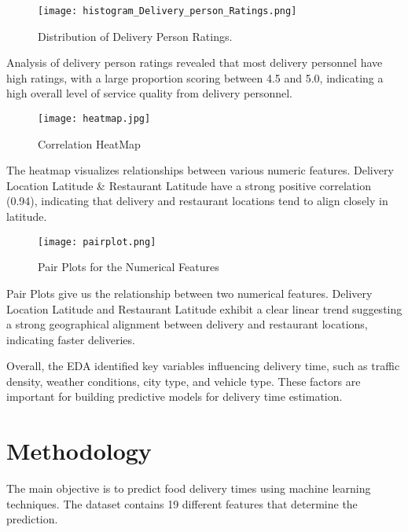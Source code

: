 \documentclass[10pt,twocolumn,letterpaper]{article}
\begin{document}
        \begin{figure}[ht]
            \centering
            \texttt{[image: histogram\_Delivery\_person\_Ratings.png]}
            \caption{Distribution of Delivery Person Ratings.}
            \label{fig:delivery_ratings}
        \end{figure}

        Analysis of delivery person ratings revealed that most delivery personnel have high ratings, with a large proportion scoring between 4.5 and 5.0, indicating a high overall level of service quality from delivery personnel.

        \begin{figure}[ht]
            \centering
            \texttt{[image: heatmap.jpg]}
            \caption{Correlation HeatMap}
            \label{fig:heatmap}
        \end{figure}

        The heatmap visualizes relationships between various numeric features. Delivery Location Latitude \& Restaurant Latitude have a strong positive correlation (0.94), indicating that delivery and restaurant locations tend to align closely in latitude.

        \begin{figure}[ht]
            \centering
            \texttt{[image: pairplot.png]}
            \caption{Pair Plots for the Numerical Features}
            \label{fig:pairplot}
        \end{figure}

        Pair Plots give us the relationship between two numerical features. Delivery Location Latitude and Restaurant Latitude exhibit a clear linear trend suggesting a strong geographical alignment between delivery and restaurant locations, indicating faster deliveries.

        Overall, the EDA identified key variables influencing delivery time, such as traffic density, weather conditions, city type, and vehicle type. These factors are important for building predictive models for delivery time estimation.

\section{Methodology}
    The main objective is to predict food delivery times using machine learning techniques. The dataset contains 19 different features that determine the prediction.
\end{document}
